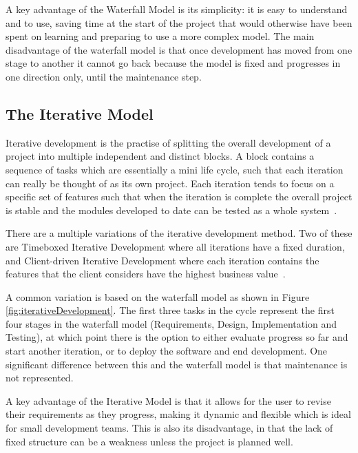 \documentclass[authoryearcitations]{UoYCSproject}
\begin{document}
A key advantage of the Waterfall Model is its simplicity: it is easy to understand and to use, saving time at the start of the project that would otherwise have been spent on learning and preparing to use a more complex model. The main disadvantage of the waterfall model is that once development has moved from one stage to another it cannot go back because the model is fixed and progresses in one direction only, until the maintenance step.

\subsection{The Iterative Model}
Iterative development is the practise of splitting the overall development of a project into multiple independent and distinct blocks.  A block contains a sequence of tasks which are essentially a mini life cycle, such that each iteration can really be thought of as its own project.  Each iteration tends to focus on a specific set of features such that when the iteration is complete the overall project is stable and the modules developed to date can be tested as a whole system~\cite{differenceBetweenLifeCycleModels}.

There are a multiple variations of the iterative development method. Two of these are Timeboxed Iterative Development where all iterations have a fixed duration, and Client-driven Iterative Development where each iteration contains the features that the client considers have the highest business value~\cite{larman2004agile}.

A common variation is based on the waterfall model as shown in Figure \ref{fig:iterativeDevelopment}.  The first three tasks in the cycle represent the first four stages in the waterfall model (Requirements, Design, Implementation and Testing), at which point there is the option to either evaluate progress so far and start another iteration, or to deploy the software and end development.  One significant difference between this and the waterfall model is that maintenance is not represented.

A key advantage of the Iterative Model is that it allows for the user to revise their requirements as they progress, making it dynamic and flexible which is ideal for small development teams.  This is also its disadvantage, in that the lack of fixed structure can be a weakness unless the project is planned well.
\end{document}
